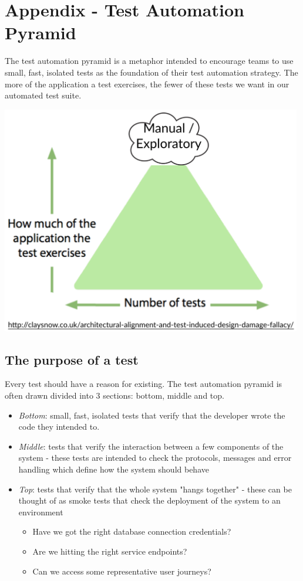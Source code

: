 \chapter*{Appendix - Test Automation Pyramid}

\label{testing-pyramid}

The test automation pyramid is a metaphor intended to encourage teams to use small, fast, isolated tests as the foundation of their test automation strategy. The more of the application a test exercises, the fewer of these tests we want in our automated test suite.

\begin{center}
\includegraphics[height=10cm]{images/testing-pyramid}
\end{center}

\section*{The purpose of a test}

Every test should have a reason for existing. The test automation pyramid is often drawn divided into 3 sections: bottom, middle and top.

\begin{itemize}
    \item \emph{Bottom}: small, fast, isolated tests that verify that the developer wrote the code they intended to.
    \item \emph{Middle}: tests that verify the interaction between a few components of the system - these tests are intended to check the protocols, messages and error handling which define how the system should behave
    \item \emph{Top}: tests that verify that the whole system "hangs together" - these can be thought of as smoke tests that check the deployment of the system to an environment
    \begin{itemize}
        \item Have we got the right database connection credentials? 
        \item Are we hitting the right service endpoints?
        \item Can we access some representative user journeys?
    \end{itemize}
\end{itemize}